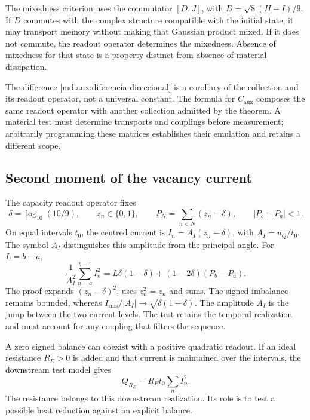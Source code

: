 The mixedness criterion uses the commutator $[D,J]$, with
$D=\sqrt8(H-I)/9$. If $D$ commutes with the complex structure
compatible with the initial state, it may transport memory without
making that Gaussian product mixed. If it does not commute, the
readout operator determines the mixedness. Absence of mixedness
for that state is a property distinct from absence of material
dissipation.

The difference \eqref{md:aux:diferencia-direccional} is a corollary
of the collection and its readout operator, not a universal constant.
The formula for $C_{\mathrm{aux}}$ composes the same readout
operator with another collection admitted by the theorem. A material
test must determine transports and couplings before measurement;
arbitrarily programming these matrices establishes their emulation
and retains a different scope.

\subsection{Second moment of the vacancy current}
\label{md:aux:vacancias}

The capacity readout operator fixes
\[
 \delta=\log_{10}(10/9),\qquad z_n\in\{0,1\},\qquad
 P_N=\sum_{n<N}(z_n-\delta),\qquad |P_b-P_a|<1.
\]
On equal intervals $t_0$, the centred current is
$I_n=A_I(z_n-\delta)$, with $A_I=u_Q/t_0$.
The symbol $A_I$ distinguishes this amplitude from the principal
angle. For $L=b-a$,
\begin{equation}
 \frac1{A_I^2}\sum_{n=a}^{b-1}I_n^2
 =L\delta(1-\delta)+(1-2\delta)(P_b-P_a).
 \label{md:aux:segundo-momento}
\end{equation}
The proof expands $(z_n-\delta)^2$, uses $z_n^2=z_n$ and sums.
The signed imbalance remains bounded, whereas
$I_{\mathrm{rms}}/|A_I|\longrightarrow\sqrt{\delta(1-\delta)}$.
The amplitude $A_I$ is the jump between the two current levels.
The test retains the temporal realization and must account for
any coupling that filters the sequence.

A zero signed balance can coexist with a positive quadratic readout.
If an ideal resistance $R_E>0$ is added and that current is
maintained over the intervals, the downstream test model gives
\begin{equation}
 Q_{R_E}=R_Et_0\sum_n I_n^2.
 \label{md:aux:contraste-resistivo}
\end{equation}
The resistance belongs to this downstream realization. Its role is
to test a possible heat reduction against an explicit balance.

